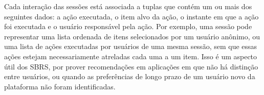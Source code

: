 Cada interação das sessões está associada a tuplas que contém um ou mais dos
seguintes dados: a ação executada, o item alvo da ação, o instante em que a ação
foi executada e o usuário responsável pela ação. Por exemplo, uma sessão pode
representar uma lista ordenada de itens selecionados por um usuário anônimo, ou
uma lista de ações executadas por usuários de uma mesma sessão, sem que essas
ações estejam necessariamente atreladas cada uma a um item. Isso é um aspecto
útil dos SBRS, por prover recomendações em aplicações em que não há
distinção entre usuários, ou quando as preferências de longo prazo de um
usuário novo da plataforma não foram identificadas.
\vspace{0.4cm}